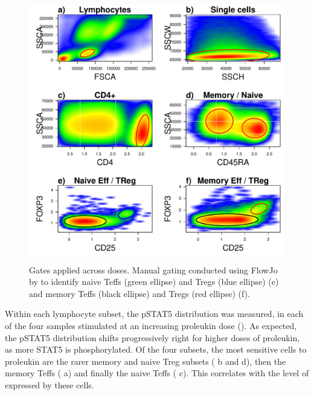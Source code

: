 \begin{figure}[h]
\centering
  \includegraphics[scale=.75]{figures/CB00366X_2012-11-07.pdf}
{Gates applied across doses.}
{
Manual gating conducted using FlowJo by  to identify
naive Teffs (green ellipse) and Tregs (blue ellipse) (e)
and memory Teffs (black ellipse) and Tregs (red ellipse) (f).
}
\end{figure}

Within each lymphocyte subset, the pSTAT5 distribution was measured, in each of the four samples stimulated at an increasing proleukin dose
().  
As expected, the pSTAT5 distribution shifts progressively right for higher doses of proleukin, as more STAT5 is phosphorylated.
Of the four subsets, the most sensitive cells to proleukin are the rarer memory and naive Treg subsets ( b and d),
then the memory Teffs ( a) and finally the naive Teffs ( c).
This correlates with the level of  expressed by these cells.

